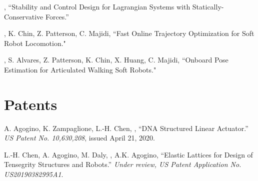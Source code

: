 \documentclass[letterpaper]{deedy-resume} %
\begin{document}
{\begin{etaremune}[itemsep=0.1cm]


  

\item \underline{{}}, ``Stability and Control Design for Lagrangian Systems with Statically-Conservative Forces.''

\item \underline{{}}, K. Chin, Z. Patterson, C. Majidi, ``Fast Online Trajectory Optimization for Soft Robot Locomotion."

\item \underline{{}}, S. Alvares, Z. Patterson, K. Chin, X. Huang, C. Majidi, ``Onboard Pose Estimation for Articulated Walking Soft Robots."

\end{etaremune}


\section{Patents}

\vspace{0.1cm}

\begin{etaremune}[itemsep=0.1cm]

\item A. Agogino, K. Zampaglione, L.-H. Chen, \underline{{}}, ``DNA Structured Linear Actuator.'' {\it US Patent No. 10,630,208}, issued April 21, 2020.

\item L.-H. Chen, A. Agogino, M. Daly, \underline{{}}, A.K. Agogino, ``Elastic Lattices for Design of Tensegrity Structures and Robots.'' {\it Under review, US Patent Application No. US20190382995A1}.


\end{etaremune}}
\end{document}
